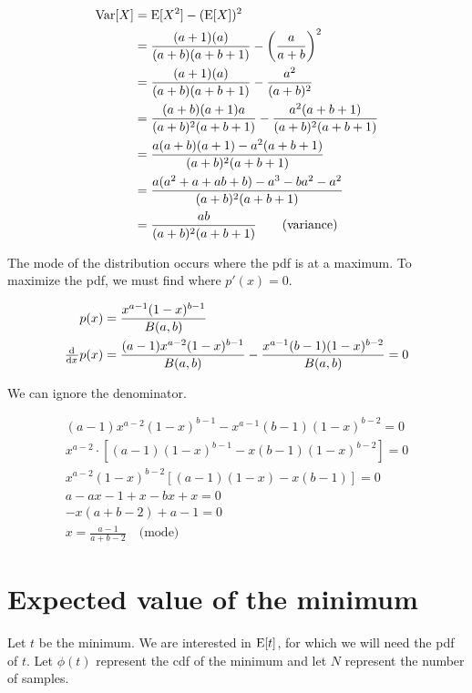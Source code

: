 \documentclass{article}
\begin{document}
\begin{align*}
  \mathrm{Var}[X] &= \mathrm{E}[X^2] - (\mathrm{E}[X])^2 \\
          &= \frac{(a+1)(a)}{(a+b)(a+b+1)} - \left(\frac{a}{a+b}\right)^2 \\
          &= \frac{(a+1)(a)}{(a+b)(a+b+1)} - \frac{a^2}{(a+b)^2} \\
          &= \frac{(a+b)(a+1)a}{(a+b)^2(a+b+1)} -
            \frac{a^2(a+b+1)}{(a+b)^2(a+b+1)} \\
          &= \frac{a(a+b)(a+1) - a^2(a+b+1)}{(a+b)^2(a+b+1)} \\
          &= \frac{a(a^2 + a + ab + b) - a^3 - ba^2 -
            a^2}{(a+b)^2(a+b+1)} \\
          &= \frac{ab}{(a+b)^2(a+b+1)} \qquad \text{(variance)}
\end{align*}

The mode of the distribution occurs where the pdf is at a maximum. To
maximize the pdf, we must find where $p'(x) = 0$.

\begin{align*}
  p(x) &= \frac{x^{a-1}(1-x)^{b-1}}{B(a,b)} \\
  \od{}{x} p(x) &= \frac{(a-1)x^{a-2}(1-x)^{b-1}}{B(a,b)} -
                 \frac{x^{a-1}(b-1)(1-x)^{b-2}}{B(a,b)} = 0 \\
\end{align*}

We can ignore the denominator.

\begin{gather*}
  (a-1)x^{a-2}(1-x)^{b-1} - x^{a-1}(b-1)(1-x)^{b-2} = 0 \\
  x^{a-2} \cdot \left[ (a-1)(1-x)^{b-1} - x(b-1)(1-x)^{b-2} \right] =
  0 \\
  x^{a-2}(1-x)^{b-2} \left[ (a-1)(1-x) - x(b-1) \right] = 0 \\
  a - ax - 1 + x - bx + x = 0 \\
  -x(a + b - 2) + a - 1 = 0 \\
  x = \frac{a-1}{a+b-2} \quad \text{(mode)}
\end{gather*}

\section{Expected value of the minimum}

Let $t$ be the minimum. We are interested in $\mathrm{E}[t]$, for which we
will need the pdf of $t$. Let $\phi(t)$ represent the cdf of the
minimum and let $N$ represent the number of samples.
\end{document}

